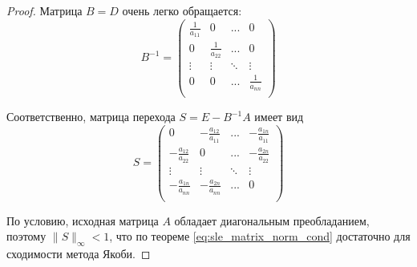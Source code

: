 \documentclass{article}
\begin{document}
\begin{proof}
	Матрица $B=D$ очень легко обращается:
	\[B^{-1}=
		\begin{pmatrix}
			\frac{1}{a_{11}}	& 0	& ...	& 0 \\
			0	& \frac{1}{a_{22}}& ...	& 0 \\
			\vdots	& \vdots&\ddots &\vdots \\
			0	& 0	& ...	& \frac{1}{a_{nn}} \\
		\end{pmatrix}
	\]

	Соответственно, матрица перехода $S=E-B^{-1}A$ имеет вид
	\[S=
		\begin{pmatrix}
			0	&-\frac{a_{12}}{a_{11}} &... &
				-\frac{a_{1n}}{a_{11}} \\
			-\frac{a_{12}}{a_{22}}& 0	&... &
				-\frac{a_{2n}}{a_{22}} \\
			\vdots	& \vdots&\ddots &\vdots \\
			-\frac{a_{1n}}{a_{nn}}	& -\frac{a_{2n}}{a_{nn}} &
				...	& 0 \\
		\end{pmatrix}
	\]

	По условию, исходная матрица $A$ обладает диагональным преобладанием,
	поэтому $\|S\|_\infty<1$, что по теореме \eqref{eq:sle_matrix_norm_cond}
	достаточно для сходимости метода Якоби.
\end{proof}
\end{document}
